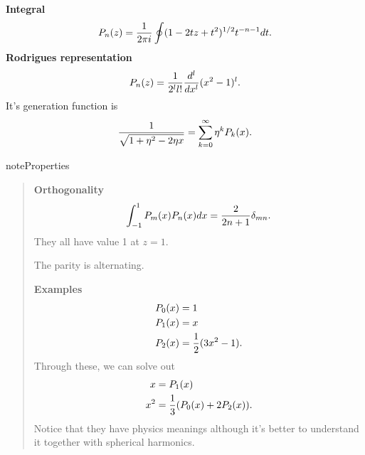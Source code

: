 \documentclass[letterpaper,10pt,english]{sphinxmanual}
\begin{document}
\textbf{Integral}
\begin{gather}
\begin{split}P_n(z) = \frac{1}{2\pi i} \oint (1 - 2 t z + t^2)^{1/2} t^{-n-1} dt.\end{split}\notag
\end{gather}
\textbf{Rodrigues representation}
\begin{gather}
\begin{split}P_n(z) = \frac{1}{2^l l!} \frac{d^l}{d x^l} (x^2 - 1)^l .\end{split}\notag
\end{gather}
It's generation function is
\begin{gather}
\begin{split}\frac{1}{\sqrt{1 + \eta^2 - 2 \eta x }} = \sum_{k=0}^\infty \eta^k P_k(x) .\end{split}\notag
\end{gather}
\begin{notice}{note}{Properties}
\begin{quote}

\textbf{Orthogonality}
\begin{gather}
\begin{split}\int_{-1}^1 P_m(x) P_n(x) dx =  \frac{2}{2n + 1}\delta_{mn} .\end{split}\notag
\end{gather}
They all have value 1 at \(z=1\).

The parity is alternating.

\textbf{Examples}
\begin{gather}
\begin{split}P_0(x) & = 1 \\
P_1(x) & = x \\
P_2(x) & = \frac{1}{2}(3x^2-1).\end{split}\notag
\end{gather}
Through these, we can solve out
\begin{gather}
\begin{split}x &= P_1(x) \\
x^2 &= \frac{1}{3}(P_0(x) + 2 P_2(x) ).\end{split}\notag
\end{gather}
Notice that they have physics meanings although it's better to understand it together with spherical harmonics.
\end{quote}
\end{notice}
\end{document}
